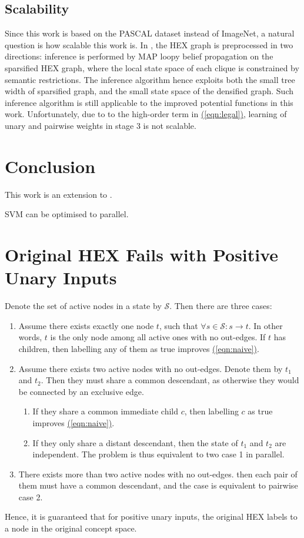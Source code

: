 \documentclass[11pt,a4paper]{article}
\begin{document}
\subsection{Scalability}
\label{sec:scale}

Since this work is based on the PASCAL dataset instead of ImageNet, a natural question is how scalable this work is. In \cite{deng2014large}, the HEX graph is preprocessed in two directions: inference is performed by MAP loopy belief propagation on the sparsified HEX graph, where the local state space of each clique is constrained by semantic restrictions. The inference algorithm hence exploits both the small tree width of sparsified graph, and the small state space of the densified graph. Such inference algorithm is still applicable to the improved potential functions in this work. Unfortunately, due to to the high-order term in \hyperref[eqn:legal]{(\ref{eqn:legal})}, learning of unary and pairwise weights in stage 3 is not scalable.

\section{Conclusion}

This work is an extension to \cite{deng2014large}.

SVM can be optimised to parallel.

\appendix
\section{Original HEX Fails with Positive Unary Inputs}
\label{sec:fail}

Denote the set of active nodes in a state by $\mathcal{S}$. Then there are three cases:
\begin{enumerate}
\item Assume there exists exactly one node $t$, such that $\forall s\in\mathcal{S}:s\rightarrow t$. In other words, $t$ is the only node among all active ones with no out-edges. If $t$ has children, then labelling any of them as true improves \hyperref[eqn:naive]{(\ref{eqn:naive})}.
\item Assume there exists two active nodes with no out-edges. Denote them by $t_1$ and $t_2$. Then they must share a common descendant, as otherwise they would be connected by an exclusive edge.
\begin{enumerate}
\item If they share a common immediate child $c$, then labelling $c$ as true improves \hyperref[eqn:naive]{(\ref{eqn:naive})}.
\item If they only share a distant descendant, then the state of $t_1$ and $t_2$ are independent. The problem is thus equivalent to two case 1 in parallel.
\end{enumerate}
\item There exists more than two active nodes with no out-edges. then each pair of them must have a common descendant, and the case is equivalent to pairwise case 2.
\end{enumerate}
Hence, it is guaranteed that for positive unary inputs, the original HEX labels to a node in the original concept space.
\end{document}
